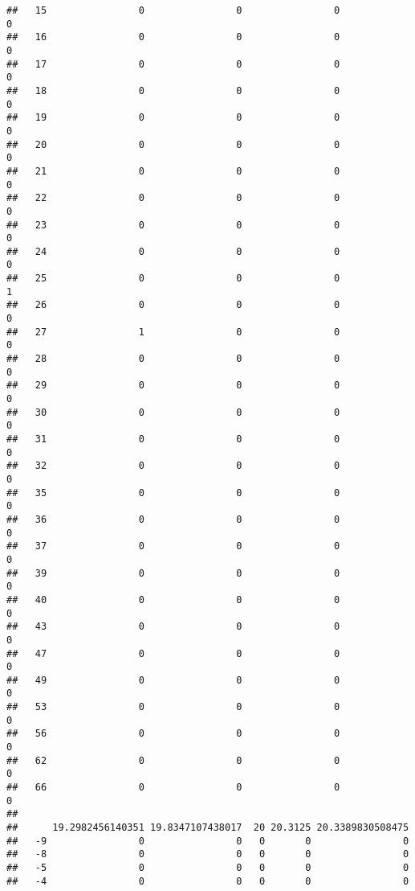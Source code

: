 \documentclass[]{article}
\begin{document}
\begin{verbatim}
##   15                0                0                0                0
##   16                0                0                0                0
##   17                0                0                0                0
##   18                0                0                0                0
##   19                0                0                0                0
##   20                0                0                0                0
##   21                0                0                0                0
##   22                0                0                0                0
##   23                0                0                0                0
##   24                0                0                0                0
##   25                0                0                0                1
##   26                0                0                0                0
##   27                1                0                0                0
##   28                0                0                0                0
##   29                0                0                0                0
##   30                0                0                0                0
##   31                0                0                0                0
##   32                0                0                0                0
##   35                0                0                0                0
##   36                0                0                0                0
##   37                0                0                0                0
##   39                0                0                0                0
##   40                0                0                0                0
##   43                0                0                0                0
##   47                0                0                0                0
##   49                0                0                0                0
##   53                0                0                0                0
##   56                0                0                0                0
##   62                0                0                0                0
##   66                0                0                0                0
##     
##      19.2982456140351 19.8347107438017  20 20.3125 20.3389830508475
##   -9                0                0   0       0                0
##   -8                0                0   0       0                0
##   -5                0                0   0       0                0
##   -4                0                0   0       0                0

\end{verbatim}
\end{document}
